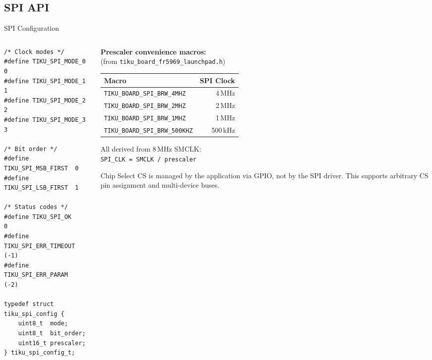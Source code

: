 \documentclass[aspectratio=169, 10pt]{beamer}
\begin{document}
\subsection{SPI API}

\begin{frame}[fragile]{SPI Configuration}
\begin{columns}[T]
\begin{column}{0.48\textwidth}
\begin{lstlisting}[style=cstyle,
  title={interfaces/bus/tiku\_spi\_bus.h}]
/* Clock modes */
#define TIKU_SPI_MODE_0  0
#define TIKU_SPI_MODE_1  1
#define TIKU_SPI_MODE_2  2
#define TIKU_SPI_MODE_3  3

/* Bit order */
#define TIKU_SPI_MSB_FIRST  0
#define TIKU_SPI_LSB_FIRST  1

/* Status codes */
#define TIKU_SPI_OK           0
#define TIKU_SPI_ERR_TIMEOUT (-1)
#define TIKU_SPI_ERR_PARAM   (-2)

typedef struct tiku_spi_config {
    uint8_t  mode;
    uint8_t  bit_order;
    uint16_t prescaler;
} tiku_spi_config_t;
\end{lstlisting}
\end{column}

\begin{column}{0.48\textwidth}
\textbf{Prescaler convenience macros:}\\
(from \texttt{tiku\_board\_fr5969\_launchpad.h})

\vspace{0.3em}
\begin{table}
\centering
\small
\begin{tabular}{@{}lr@{}}
\toprule
\textbf{Macro} & \textbf{SPI Clock} \\
\midrule
\texttt{TIKU\_BOARD\_SPI\_BRW\_4MHZ}   & 4\,MHz \\
\texttt{TIKU\_BOARD\_SPI\_BRW\_2MHZ}   & 2\,MHz \\
\texttt{TIKU\_BOARD\_SPI\_BRW\_1MHZ}   & 1\,MHz \\
\texttt{TIKU\_BOARD\_SPI\_BRW\_500KHZ} & 500\,kHz \\
\bottomrule
\end{tabular}
\end{table}

\vspace{0.3em}
All derived from 8\,MHz SMCLK:\\
\texttt{SPI\_CLK = SMCLK / prescaler}

\vspace{0.3em}
\begin{block}{Chip Select}
CS is managed by the application via GPIO,
not by the SPI driver. This supports
arbitrary CS pin assignment and multi-device buses.
\end{block}
\end{column}
\end{columns}
\end{frame}
\end{document}
